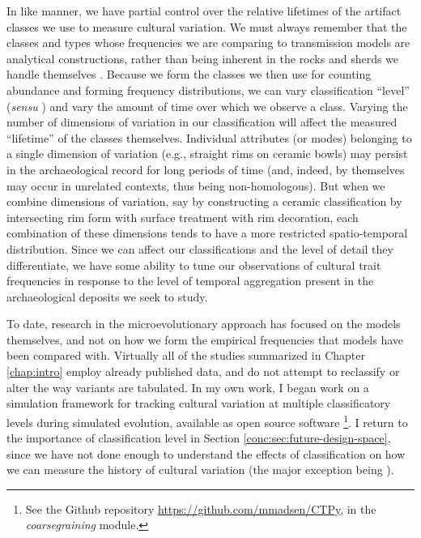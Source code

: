 In like manner, we have partial control over the relative lifetimes of the artifact classes we use to measure cultural variation.  We must always remember that the classes and types whose frequencies we are comparing to transmission models are analytical constructions, rather than being inherent in the rocks and sherds we handle themselves \citep{Dunnell1971}.  Because we form the classes we then use for counting abundance and forming frequency distributions, we can vary classification ``level'' (\emph{sensu} \citealt{Dunnell1971}) and vary the amount of time over which we observe a class.  Varying the number of dimensions of variation in our classification will affect the measured ``lifetime'' of the classes themselves.  Individual attributes (or modes) belonging to a single dimension of variation (e.g., straight rims on ceramic bowls) may persist in the archaeological record for long periods of time (and, indeed, by themselves may occur in unrelated contexts, thus being non-homologous).  But when we combine dimensions of variation, say by constructing a ceramic classification by intersecting rim form with surface treatment with rim decoration, each combination of these dimensions tends to have a more restricted spatio-temporal distribution.  Since we can affect our classifications and the level of detail they differentiate, we have some ability to tune our observations of cultural trait frequencies in response to the level of temporal aggregation present in the archaeological deposits we seek to study.  

To date, research in the microevolutionary approach has focused on the models themselves, and not on how we form the empirical frequencies that models have been compared with.  Virtually all of the studies summarized in Chapter \ref{chap:intro} employ already published data, and do not attempt to reclassify or alter the way variants are tabulated.  In my own work, I began work on a simulation framework for tracking cultural variation at multiple classificatory levels during simulated evolution, available as open source software \footnote{See the Github repository \url{https://github.com/mmadsen/CTPy}, in the \emph{coarsegraining} module.}.   I return to the importance of classification level in Section \ref{conc:sec:future-design-space}, since we have not done enough to understand the effects of classification on how we can measure the history of cultural variation (the major exception being \citealt{Lipo2001}). 

